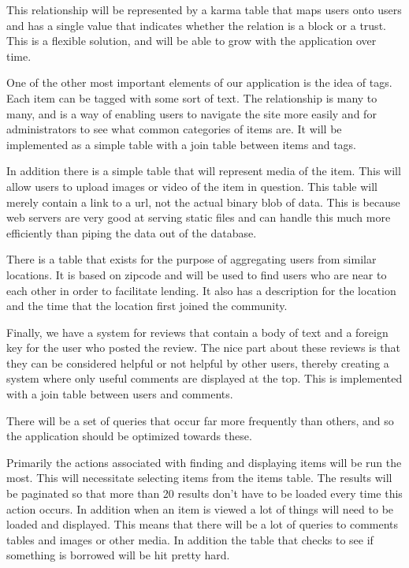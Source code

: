 \documentclass{acm_proc_article-sp}
\begin{document}
This relationship will be represented by a karma table that maps users onto users and has a single value that indicates whether the relation is a block or a trust. This is a flexible solution, and will be able to grow with the application over time.

One of the other most important elements of our application is the idea of tags. Each item can be tagged with some sort of text. The relationship is many to many, and is a way of enabling users to navigate the site more easily and for administrators to see what common categories of items are. It will be implemented as a simple table with a join table between items and tags.

In addition there is a simple table that will represent media of the item. This will allow users to upload images or video of the item in question. This table will merely contain a link to a url, not the actual binary blob of data. This is because web servers are very good at serving static files and can handle this much more efficiently than piping the data out of the database.

There is a table that exists for the purpose of aggregating users from similar locations. It is based on zipcode and will be used to find users who are near to each other in order to facilitate lending. It also has a description for the location and the time that the location first joined the community.

Finally, we have a system for reviews that contain a body of text and a foreign key for the user who posted the review. The nice part about these reviews is that they can be considered helpful or not helpful by other users, thereby creating a system where only useful comments are displayed at the top. This is implemented with a join table between users and comments.

There will be a set of queries that occur far more frequently than others, and so the application should be optimized towards these.

Primarily the actions associated with finding and displaying items will be run the most. This will necessitate selecting items from the items table. The results will be paginated so that more than 20 results don't have to be loaded every time this action occurs. In addition when an item is viewed a lot of things will need to be loaded and displayed. This means that there will be a lot of queries to comments tables and images or other media. In addition the table that checks to see if something is borrowed will be hit pretty hard.
\end{document}

